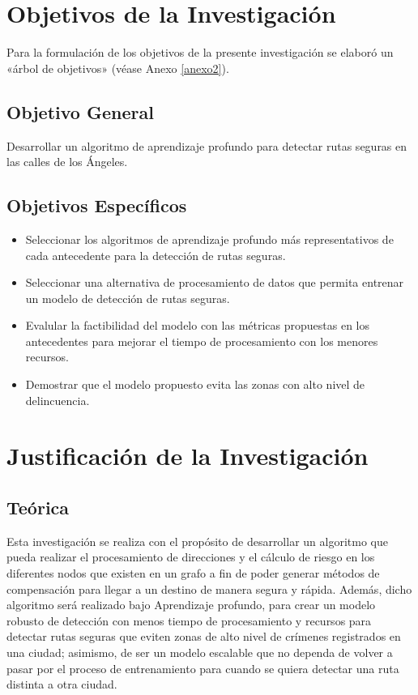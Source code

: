 \section{Objetivos de la Investigación}
Para la formulación de los objetivos de la presente investigación se elaboró un «árbol de objetivos» (véase Anexo \ref{anexo2}).
\subsection{Objetivo General}
\newcommand{\ObjetivoGeneral}{
Desarrollar un algoritmo de aprendizaje profundo para detectar rutas seguras en las calles de los Ángeles.
}
\ObjetivoGeneral
\subsection{Objetivos Espec\'{i}ficos}
\newcommand{\Objone}{
Seleccionar los algoritmos de aprendizaje profundo más representativos de cada antecedente para la detección de rutas seguras.
}
\newcommand{\Objtwo}{
Seleccionar una alternativa de procesamiento de datos que permita entrenar un modelo de detección de rutas seguras.
}
\newcommand{\Objthree}{
Evalular la factibilidad del modelo con las métricas propuestas en los antecedentes para mejorar el tiempo de procesamiento con los menores recursos.
}
\newcommand{\Objfour}{
Demostrar que el modelo propuesto evita las zonas con alto nivel de delincuencia.
}

\begin{itemize}
	\item {\Objone}
	\item {\Objtwo}
	\item {\Objthree}
	\item {\Objfour}
\end{itemize}

\section{Justificación de la Investigación}

\subsection{Teórica}
Esta investigación se realiza con el propósito de desarrollar un algoritmo que pueda realizar el procesamiento de direcciones y el cálculo de riesgo en los diferentes nodos que existen en un grafo a fin de poder generar métodos de compensación para llegar a un destino de manera segura y rápida. Además, dicho algoritmo será realizado bajo Aprendizaje profundo, para crear un modelo robusto de detección con menos tiempo de procesamiento y recursos para detectar rutas seguras que eviten zonas de alto nivel de crímenes registrados en una ciudad; asimismo, de ser un modelo escalable que no dependa de volver a pasar por el proceso de entrenamiento para cuando se quiera detectar una ruta distinta a otra ciudad.

